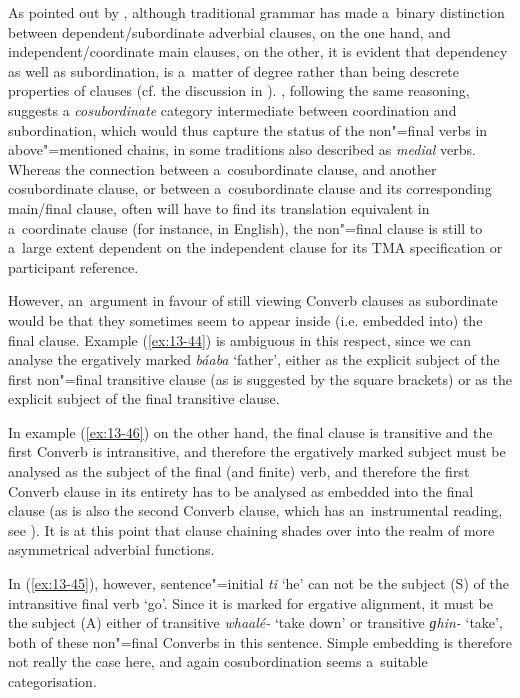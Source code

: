 As pointed out by \citet[327-8]{givon2001b}, although traditional grammar has made a~binary distinction between dependent/subordinate adverbial clauses, on the one hand, and independent/coordinate main clauses, on the other, it is evident that dependency as well as subordination, is a~matter of degree rather than being descrete properties of clauses (cf.  the discussion in \citet[]{cristofaro2005}). \citet[20--27]{haspelmath1995}, following the same reasoning, suggests a \textit{cosubordinate} category intermediate between coordination and subordination, which would thus capture the status of the non"=final verbs in above"=mentioned chains, in some traditions also described as \textit{medial} verbs. Whereas the connection between a~cosubordinate clause, and another cosubordinate clause, or between a~cosubordinate clause and its corresponding main/final clause, often will have to find its translation equivalent in a~coordinate clause (for instance, in English), the non"=final clause is still to a~large extent dependent on the independent clause for its TMA specification or participant reference.



However, an~argument in favour of still viewing Converb clauses as subordinate would be that they sometimes seem to appear inside (i.e. embedded into) the final clause. Example (\ref{ex:13-44}) is ambiguous in this respect, since we can analyse the ergatively marked \textit{báaba} `father', either as the explicit subject of the first non"=final transitive clause (as is suggested by the square brackets) or as the explicit subject of the final transitive clause. 



In example (\ref{ex:13-46}) on the other hand, the final clause is transitive and the first Converb is intransitive, and therefore the ergatively marked subject must be analysed as the subject of the final (and finite) verb, and therefore the first Converb clause in its entirety has to be analysed as embedded into the final clause (as is also the second Converb clause, which has an~instrumental reading, see ). It is at this point that clause chaining shades over into the realm of more asymmetrical adverbial functions. 



In (\ref{ex:13-45}), however, sentence"=initial \textit{ti} `he' can not be the subject (S) of the intransitive final verb `go'. Since it is marked for ergative alignment, it must be the subject (A) either of transitive \textit{whaalé-} `take down' or transitive \textit{ɡhin-} `take', both of these non"=final Converbs in this sentence. Simple embedding is therefore not really the case here, and again cosubordination seems a~suitable categorisation. 



